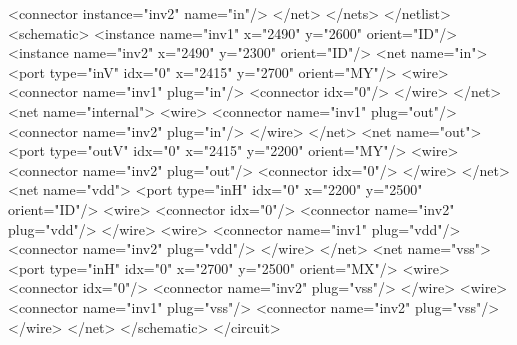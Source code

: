 \begin{DoxyCodeInclude}
        <connector instance=\textcolor{stringliteral}{"inv2"} name=\textcolor{stringliteral}{"in"}/>
      </net>
    </nets>
  </netlist>
  <schematic>
    <instance name=\textcolor{stringliteral}{"inv1"} x=\textcolor{stringliteral}{"2490"} y=\textcolor{stringliteral}{"2600"} orient=\textcolor{stringliteral}{"ID"}/>
    <instance name=\textcolor{stringliteral}{"inv2"} x=\textcolor{stringliteral}{"2490"} y=\textcolor{stringliteral}{"2300"} orient=\textcolor{stringliteral}{"ID"}/>
    <net name=\textcolor{stringliteral}{"in"}>
      <port type=\textcolor{stringliteral}{"inV"} idx=\textcolor{stringliteral}{"0"} x=\textcolor{stringliteral}{"2415"} y=\textcolor{stringliteral}{"2700"} orient=\textcolor{stringliteral}{"MY"}/>
      <wire>
        <connector name=\textcolor{stringliteral}{"inv1"} plug=\textcolor{stringliteral}{"in"}/>
        <connector idx=\textcolor{stringliteral}{"0"}/>
      </wire>
    </net>
    <net name=\textcolor{stringliteral}{"internal"}>
      <wire>
        <connector name=\textcolor{stringliteral}{"inv1"} plug=\textcolor{stringliteral}{"out"}/>
        <connector name=\textcolor{stringliteral}{"inv2"} plug=\textcolor{stringliteral}{"in"}/>
      </wire>
    </net>
    <net name=\textcolor{stringliteral}{"out"}>
      <port type=\textcolor{stringliteral}{"outV"} idx=\textcolor{stringliteral}{"0"} x=\textcolor{stringliteral}{"2415"} y=\textcolor{stringliteral}{"2200"} orient=\textcolor{stringliteral}{"MY"}/>
      <wire>
        <connector name=\textcolor{stringliteral}{"inv2"} plug=\textcolor{stringliteral}{"out"}/>
        <connector idx=\textcolor{stringliteral}{"0"}/>
      </wire>
    </net>
    <net name=\textcolor{stringliteral}{"vdd"}>
      <port type=\textcolor{stringliteral}{"inH"} idx=\textcolor{stringliteral}{"0"} x=\textcolor{stringliteral}{"2200"} y=\textcolor{stringliteral}{"2500"} orient=\textcolor{stringliteral}{"ID"}/>
      <wire>
        <connector idx=\textcolor{stringliteral}{"0"}/>
        <connector name=\textcolor{stringliteral}{"inv2"} plug=\textcolor{stringliteral}{"vdd"}/>
      </wire>
      <wire>
        <connector name=\textcolor{stringliteral}{"inv1"} plug=\textcolor{stringliteral}{"vdd"}/>
        <connector name=\textcolor{stringliteral}{"inv2"} plug=\textcolor{stringliteral}{"vdd"}/>
      </wire>
    </net>
    <net name=\textcolor{stringliteral}{"vss"}>
      <port type=\textcolor{stringliteral}{"inH"} idx=\textcolor{stringliteral}{"0"} x=\textcolor{stringliteral}{"2700"} y=\textcolor{stringliteral}{"2500"} orient=\textcolor{stringliteral}{"MX"}/>
      <wire>
        <connector idx=\textcolor{stringliteral}{"0"}/>
        <connector name=\textcolor{stringliteral}{"inv2"} plug=\textcolor{stringliteral}{"vss"}/>
      </wire>
      <wire>
        <connector name=\textcolor{stringliteral}{"inv1"} plug=\textcolor{stringliteral}{"vss"}/>
        <connector name=\textcolor{stringliteral}{"inv2"} plug=\textcolor{stringliteral}{"vss"}/>
      </wire>
    </net>
  </schematic>
</circuit>
\end{DoxyCodeInclude}


